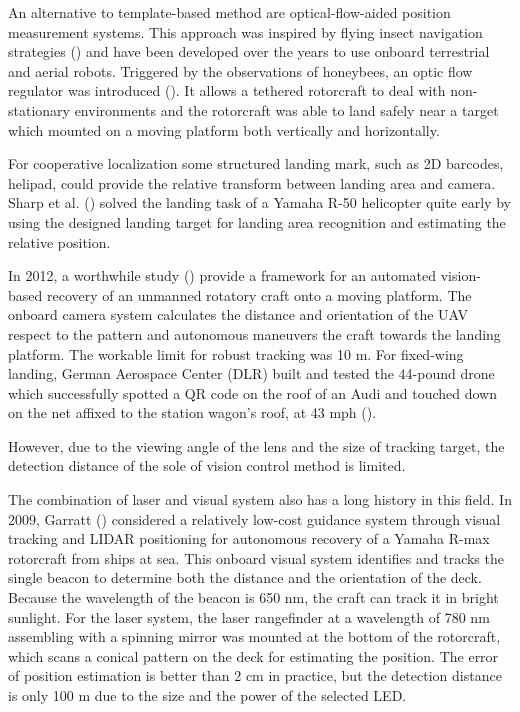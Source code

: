An alternative to template-based method are optical-flow-aided position measurement systems. This approach was inspired by flying insect navigation strategies (\cite{Green2004}) and have been developed over the years to use onboard terrestrial and aerial robots. Triggered by the observations of honeybees, an optic flow regulator was introduced (\cite{Ruffier2014}). It allows a tethered rotorcraft to deal with non-stationary environments and the rotorcraft was able to land safely near a target which mounted on a moving platform both vertically and horizontally.

For cooperative localization some structured landing mark, such as 2D barcodes, helipad, could provide the relative transform between landing area and camera. Sharp et al. (\cite{Sharp2001}) solved the landing task of a Yamaha R-50 helicopter quite early by using the designed landing target for landing area recognition and estimating the relative position. 

In 2012, a worthwhile study (\cite{richardsonautomated2013}) provide a framework for an automated vision-based recovery of an unmanned rotatory craft onto a moving platform. The onboard camera system calculates the distance and orientation of the UAV respect to the pattern and autonomous maneuvers the craft towards the landing platform. The workable limit for robust tracking was 10 m. For fixed-wing landing, German Aerospace Center (DLR) built and tested the 44-pound drone which successfully spotted a QR code on the roof of an Audi and touched down on the net affixed to the station wagon’s roof, at 43 mph (\cite{DLR_Landing}).

However, due to the viewing angle of the lens and the size of tracking target, the detection distance of the sole of vision control method is limited.



The combination of laser and visual system also has a long history in this field. In 2009, Garratt (\cite{garrattvisual2009}) considered a relatively low-cost guidance system through visual tracking and LIDAR positioning for autonomous recovery of a Yamaha R-max rotorcraft from ships at sea. This onboard visual system identifies and tracks the single beacon to determine both the distance and the orientation of the deck. Because the wavelength of the beacon is 650 nm, the craft can track it in bright sunlight. For the laser system, the laser rangefinder at a wavelength of 780 nm assembling with a spinning mirror was mounted at the bottom of the rotorcraft, which scans a conical pattern on the deck for estimating the position. The error of position estimation is better than 2 cm in practice, but the detection distance is only 100 m due to the size and the power of the selected LED. 


